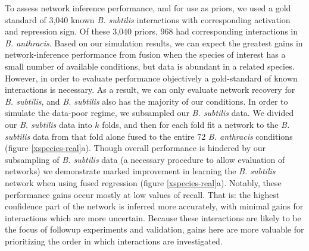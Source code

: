 \documentclass[11pt]{article}
\begin{document}
To assess network inference performance, and for use as priors, we used a gold standard of 3,040 known \textit{B. subtilis} interactions with corresponding activation and repression sign. 
Of these 3,040 priors, 968 had corresponding interactions in \textit{B. anthracis}. 
Based on our simulation results, we can expect the greatest gains in network-inference performance from fusion when the species of interest has a small number of available conditions, but data is abundant in a related species. 
However, in order to evaluate performance objectively a gold-standard of known interactions is necessary. 
As a result, we can only evaluate network recovery for \textit{B. subtilis}, and \textit{B. subtilis} also has the majority of our conditions. 
In order to simulate the data-poor regime, we subsampled our \textit{B. subtilis} data. 
We divided our \textit{B. subtilis} data into $k$ folds, and then for each fold fit a network to the \textit{B. subtilis} data from that fold alone fused to the entire 72 \textit{B. anthracis} conditions (figure \ref{xspecies-real}a). 
Though overall performance is hindered by our subsampling of \textit{B. subtilis} data (a necessary procedure to allow evaluation of networks) we demonstrate marked improvement in learning the \textit{B. subtilis} network when using fused regression (figure \ref{xspecies-real}a). 
Notably, these performance gains occur mostly at low values of recall. That is: the highest confidence part of the network is inferred more accurately, with minimal gains for interactions which are more uncertain. Because these interactions are likely to be the focus of followup experiments and validation, gains here are more valuable for prioritizing the order in which interactions are investigated. 
\end{document}

